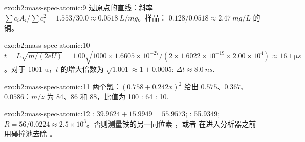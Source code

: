 \begin{solution}{exo:b2:mass-spec-atomic:9}
过原点的直线：斜率 $\sum c_iA_i/\sum c_i^2 = 1.553/30.0 \approx \qty{0.0518}{L/mg}$。样品：
$0.128/0.0518 \approx \qty{2.47}{mg/L}$ 的铜。
\end{solution}

\begin{solution}{exo:b2:mass-spec-atomic:10}
$t = L\sqrt{m/(2eU)} = 1.00\sqrt{1000 \times 1.6605 \times 10^{-27}/(2 \times 1.6022 \times 10^{-19}
\times 2.00 \times 10^4)} \approx \qty{16.1}{\micro s}$。对于 1001 u，$t$ 的增大倍数为
$\sqrt{1.001} \approx 1 + 0.0005$: $\Delta t \approx \qty{8.0}{ns}$.
\end{solution}

\begin{solution}{exo:b2:mass-spec-atomic:11}
两个氯：$(0.758 + 0.242x)^2$ 给出 $0.575$、$0.367$、$0.0586$：$m/z$ 为 84、86 和 88，比值为
100 : 64 : 10.
\end{solution}

\begin{solution}{exo:b2:mass-spec-atomic:12}
: $39.9624 + 15.9949 = 55.9573$; : 55.9349; $R = 56/0.0224 \approx 2.5 \times
10^3$。否则测量铁的另一同位素 ，或者
在进入分析器之前用碰撞池去除 。
\end{solution}


